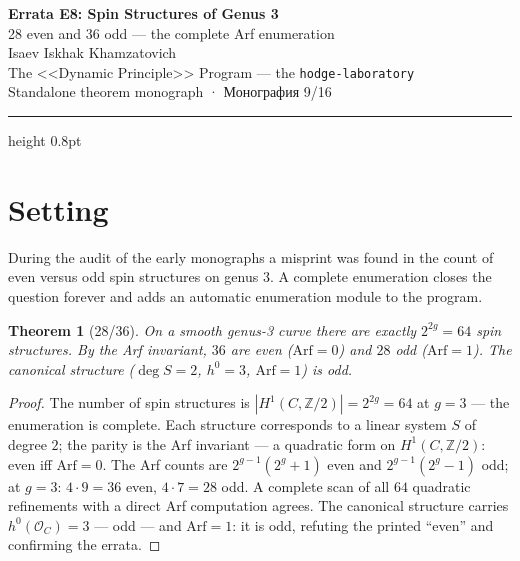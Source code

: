 \documentclass[11pt,a4paper]{article}
\theoremstyle{plain}
\newtheorem{theorem}{Theorem}
\theoremstyle{definition}
\theoremstyle{remark}
\newcommand{\ZZ}{\mathbb{Z}}
\begin{document}
\begin{center}
{\LARGE\bfseries Errata E8: Spin Structures of Genus 3}\\[0.4em]
{\large 28 even and 36 odd — the complete Arf enumeration}\\[0.6em]
{\normalsize Isaev Iskhak Khamzatovich}\\[0.2em]
{\normalsize The <<Dynamic Principle>> Program --- the \texttt{hodge-laboratory}}\\[0.15em]
{\small Standalone theorem monograph · Монография 9/16}
\end{center}
\vspace{0.4em}
{\color{linkblue}\hrule height 0.8pt}
\vspace{0.8em}

\section{Setting}

During the audit of the early monographs a misprint was found in the
count of even versus odd spin structures on genus $3$. A complete
enumeration closes the question forever and adds an automatic
enumeration module to the program.

\begin{theorem}[28/36]\label{th:e8stand}
On a smooth genus-3 curve there are exactly $2^{2g}=64$ spin
structures. By the Arf invariant, $36$ are even ($\mathrm{Arf}=0$)
and $28$ odd ($\mathrm{Arf}=1$). The canonical structure
($\deg S=2$, $h^0=3$, $\mathrm{Arf}=1$) is odd.
\end{theorem}

\begin{proof}
The number of spin structures is $|H^1(C,\ZZ/2)|=2^{2g}=64$ at
$g=3$ --- the enumeration is complete. Each structure corresponds
to a linear system $S$ of degree $2$; the parity is the Arf
invariant --- a quadratic form on $H^1(C,\ZZ/2)$: even iff
$\mathrm{Arf}=0$. The Arf counts are $2^{g-1}(2^g+1)$ even and $2^{g-1}(2^g-1)$ odd;
at $g=3$: $4\cdot9=36$ even, $4\cdot7=28$ odd. A complete scan of
all $64$ quadratic refinements with a direct Arf computation agrees.
The canonical structure carries $h^0(\mathcal O_C)=3$ --- odd ---
and $\mathrm{Arf}=1$: it is odd, refuting the printed ``even'' and
confirming the errata.
\end{proof}
\end{document}
